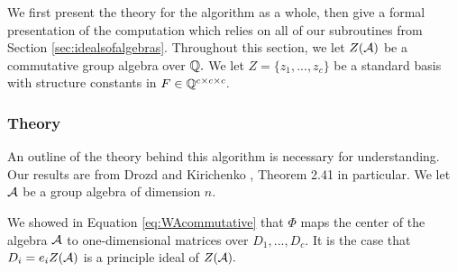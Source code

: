 \documentclass[../thesis.tex]{subfiles}
\begin{document}
We first present the theory for the algorithm as a whole, then give a formal presentation of the computation which relies on all of our subroutines from Section \ref{sec:idealsofalgebras}. Throughout this section, we let $Z(\mathcal{A})$ be a commutative group algebra over $\mathbb{Q}.$ We let $Z=\{z_1,...,z_c\}$ be a standard basis with structure constants in $F\in\mathbb{Q}^{c\times c\times c}.$

\subsubsection{Theory}
An outline of the theory behind this algorithm is necessary for understanding. Our results are from Drozd and Kirichenko \cite{drozd}, Theorem 2.41 in particular. We let $\mathcal{A}$ be a group algebra of dimension $n$.

We showed in Equation \ref{eq:WAcommutative} that $\Phi$ maps the center of the algebra $\mathcal{A}$ to one-dimensional matrices over $D_1,...,D_c.$ It is the case that $D_i = e_i Z(\mathcal{A})$ is a principle ideal of $Z(\mathcal{A}).$ 
\end{document}
